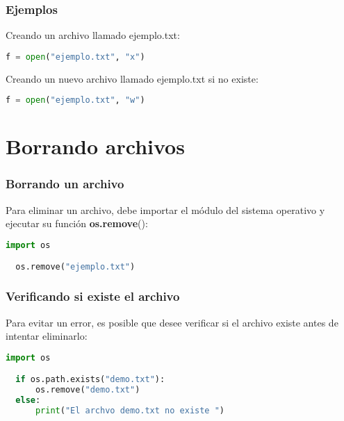 \begin{frame}[fragile]
  \frametitle{Ejemplos}

  Creando un archivo llamado ejemplo.txt:

  \vspace{\baselineskip}
  \begin{lstlisting}[language=Python]
  f = open("ejemplo.txt", "x")
  \end{lstlisting}

  \vspace{\baselineskip}
  Creando un nuevo archivo llamado ejemplo.txt si no existe:

  \vspace{\baselineskip}
  \begin{lstlisting}[language=Python]
  f = open("ejemplo.txt", "w")
  \end{lstlisting}

\end{frame}

\section{Borrando archivos}

\begin{frame}[fragile]
  \frametitle{Borrando un archivo}

  Para eliminar un archivo, debe importar el módulo del sistema operativo
  y ejecutar su función \textbf{os.remove}():

  \vspace{\baselineskip}
  \begin{lstlisting}[language=Python]
  import os

  os.remove("ejemplo.txt")
  \end{lstlisting}
\end{frame}

\begin{frame}[fragile]
  \frametitle{Verificando si existe el archivo}

  Para evitar un error, es posible que desee verificar si el archivo
  existe antes de intentar eliminarlo:

  \vspace{\baselineskip}
  \begin{lstlisting}[language=Python]
  import os

  if os.path.exists("demo.txt"):
      os.remove("demo.txt")
  else:
      print("El archvo demo.txt no existe ")
  \end{lstlisting}
\end{frame}

